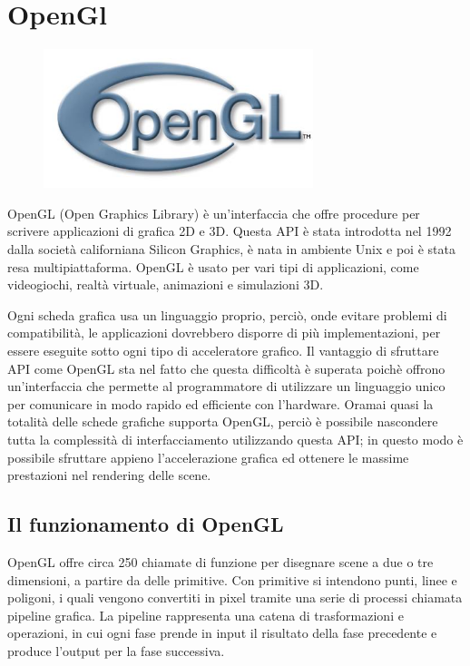 
\section{OpenGl}

\begin{figure}[hbp]
\centering
\includegraphics[width=0.7\textwidth]{images/openGL/OpenGL_logo.jpg}
\end{figure}


OpenGL (Open Graphics Library) è un'interfaccia che offre procedure per scrivere applicazioni di grafica 2D e 3D. Questa API è stata introdotta nel 1992 dalla società californiana Silicon Graphics, è nata in ambiente Unix e poi è stata resa multipiattaforma. OpenGL è usato per vari tipi di applicazioni, come videogiochi, realtà virtuale, animazioni e simulazioni 3D.

Ogni scheda grafica usa un linguaggio proprio, perciò, onde evitare problemi di compatibilità, le applicazioni dovrebbero disporre di più implementazioni, per essere eseguite sotto ogni tipo di acceleratore grafico. Il vantaggio di sfruttare API come OpenGL sta nel fatto che questa difficoltà è superata poichè offrono un'interfaccia che permette al programmatore di utilizzare un linguaggio unico per comunicare in modo rapido ed efficiente con l'hardware. Oramai quasi la totalità delle schede grafiche supporta OpenGL, perciò è possibile nascondere tutta la complessità di interfacciamento utilizzando questa API; in questo modo è possibile sfruttare appieno l'accelerazione grafica ed ottenere le massime prestazioni nel rendering delle scene.



\subsection{Il funzionamento di OpenGL}
OpenGL offre circa 250 chiamate di funzione per disegnare scene a due o tre dimensioni, a partire da delle primitive. Con primitive si intendono punti, linee e poligoni, i quali vengono convertiti in pixel tramite una serie di processi chiamata pipeline grafica.
La pipeline rappresenta una catena di trasformazioni e operazioni, in cui ogni fase prende in input il risultato della fase precedente e produce l'output per la fase successiva.

